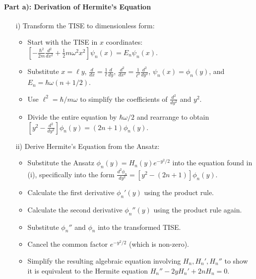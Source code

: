 \documentclass[10pt]{article}
\begin{document}
\paragraph{Part a): Derivation of Hermite's Equation}
\begin{enumerate}
    \item[i)] Transform the TISE to dimensionless form:
        \begin{itemize}
            \item Start with the TISE in \(x\) coordinates: \([-\frac{\hbar^2}{2m}\frac{d^2}{dx^2} + \frac{1}{2}m\omega^2 x^2] \psi_n(x) = E_n \psi_n(x)\).
            \item Substitute \(x = \ell y\), \(\frac{d}{dx} = \frac{1}{\ell}\frac{d}{dy}\), \(\frac{d^2}{dx^2} = \frac{1}{\ell^2}\frac{d^2}{dy^2}\), \(\psi_n(x) = \phi_n(y)\), and \(E_n = \hbar\omega(n+1/2)\).
            \item Use \(\ell^2 = \hbar/m\omega\) to simplify the coefficients of \(\frac{d^2}{dy^2}\) and \(y^2\).
            \item Divide the entire equation by \(\hbar\omega/2\) and rearrange to obtain \(\left[y^{2}-\frac{d^{2}}{d y^{2}}\right] \phi_{n}(y)=(2 n+1) \phi_{n}(y)\).
        \end{itemize}
    \item[ii)] Derive Hermite's Equation from the Ansatz:
        \begin{itemize}
            \item Substitute the Ansatz \(\phi_n(y) = H_n(y) e^{-y^2/2}\) into the equation found in (i), specifically into the form \(\frac{d^2\phi_n}{dy^2} = [y^2 - (2n+1)] \phi_n(y)\).
            \item Calculate the first derivative \(\phi_n'(y)\) using the product rule.
            \item Calculate the second derivative \(\phi_n''(y)\) using the product rule again.
            \item Substitute \(\phi_n''\) and \(\phi_n\) into the transformed TISE.
            \item Cancel the common factor \(e^{-y^2/2}\) (which is non-zero).
            \item Simplify the resulting algebraic equation involving \(H_n, H_n', H_n''\) to show it is equivalent to the Hermite equation \(H_n'' - 2yH_n' + 2nH_n = 0\).
        \end{itemize}
\end{enumerate}
\end{document}
